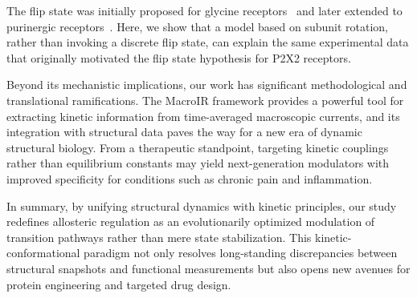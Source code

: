 \documentclass[pdflatex,sn-nature]{sn-jnl}%
\begin{document}
The flip state was initially proposed for glycine receptors~\cite{burzomato2004single} and later extended to purinergic receptors~\cite{Moffatt_hume, jiang2012intermediate, browne2013p2x}. Here, we show that a model based on subunit rotation, rather than invoking a discrete flip state, can explain the same experimental data that originally motivated the flip state hypothesis for P2X2 receptors.

Beyond its mechanistic implications, our work has significant methodological and translational ramifications. The MacroIR framework provides a powerful tool for extracting kinetic information from time-averaged macroscopic currents, and its integration with structural data paves the way for a new era of dynamic structural biology. From a therapeutic standpoint, targeting kinetic couplings rather than equilibrium constants may yield next-generation modulators with improved specificity for conditions such as chronic pain and inflammation.

In summary, by unifying structural dynamics with kinetic principles, our study redefines allosteric regulation as an evolutionarily optimized modulation of transition pathways rather than mere state stabilization. This kinetic-conformational paradigm not only resolves long-standing discrepancies between structural snapshots and functional measurements but also opens new avenues for protein engineering and targeted drug design.

\end{document}
